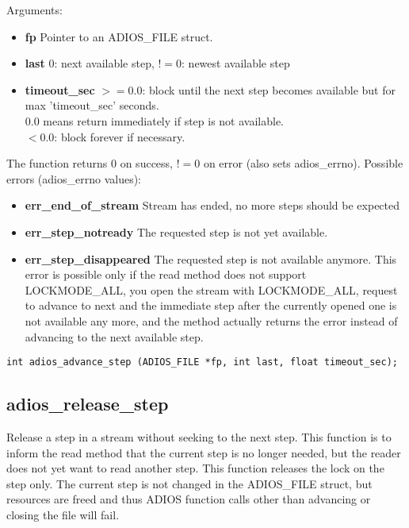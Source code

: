 \noindent Arguments:
\begin{itemize}
\item{\bf fp}       Pointer to an ADIOS\_FILE struct.
\item{\bf last}     $0$: next available step, $!=0$: newest available step 
 \item{\bf timeout\_sec}  $>=0.0$: block until the next step becomes available but 
for max 'timeout\_sec' seconds.\\
$0.0$ means return immediately if step is not available.\\
$<0.0$: block forever if necessary.
\end{itemize}

\noindent The function returns 0 on success, $!=0$ on error (also sets adios\_errno).
Possible errors (adios\_errno values):

\begin{itemize}
\item{\bf err\_end\_of\_stream}    Stream has ended, no more steps should be expected

\item{\bf err\_step\_notready}    The requested step is not yet available.

\item{\bf err\_step\_disappeared} The requested step is not available anymore. This error is possible only if the read method does not support LOCKMODE\_ALL, you open the stream with LOCKMODE\_ALL, request to advance to next and the immediate step after the currently opened one is not available any more, and the method actually returns the error instead of advancing to the next available step. 
\end{itemize}


\begin{lstlisting}[alsolanguage=C]
int adios_advance_step (ADIOS_FILE *fp, int last, float timeout_sec); 
\end{lstlisting}

\subsection{adios\_release\_step}
Release a step in a stream without seeking to the next step.
This function is to inform the read method that the current step is
no longer needed, but the reader does not yet want to read another step.
This function releases the lock on the step only. The current step is not
changed in the ADIOS\_FILE struct, but resources are freed and thus ADIOS function calls other than advancing or closing the file will fail. 

